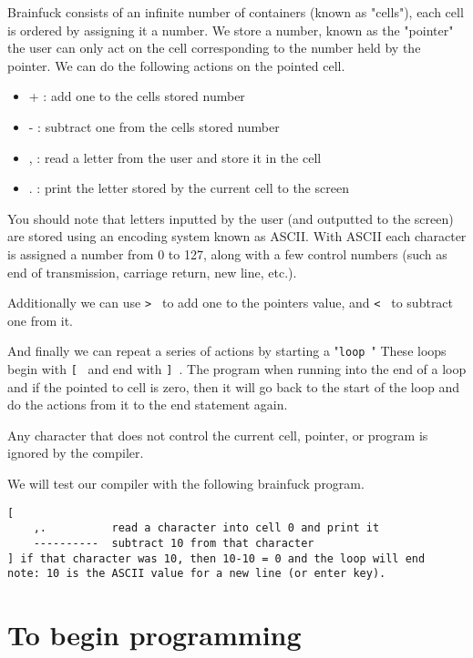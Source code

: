 \documentclass[12pt]{article}
\begin{document}
Brainfuck consists of an infinite number of containers
(known as "cells"), each cell is ordered by assigning
it a number. We store a number, known as the "pointer"
the user can only act on the cell corresponding to the
number held by the pointer. We can do the following
actions on the pointed cell.

\begin{itemize}
    \item{+ : add one to the cells stored number}
    \item{- : subtract one from the cells stored number}
    \item{, : read a letter from the user and store it in
        the cell}
    \item{. : print the letter stored by the current cell
        to the screen}
\end{itemize}

You should note that letters inputted by the user (and
outputted to the screen) are stored using an encoding
system known as ASCII. With ASCII each character
is assigned a number from 0 to 127, along with a few
control numbers (such as end of transmission, carriage
return, new line, etc.).

Additionally we can use {\tt > } to add one to the pointers
value, and {\tt < } to subtract one from it.

And finally we can repeat a series of actions by starting
a "{\tt loop }" These loops begin with {\tt [ } and end with
{\tt ] }. The program when running into the end of a loop
and if the pointed to cell is zero, then it will go back to the
start of the loop and do the actions from it to the end statement
again.

Any character that does not control the current cell, pointer,
or program is ignored by the compiler.

We will test our compiler with the following brainfuck program.

\begin{verbatim}
[
    ,.          read a character into cell 0 and print it
    ----------  subtract 10 from that character
] if that character was 10, then 10-10 = 0 and the loop will end
note: 10 is the ASCII value for a new line (or enter key).
\end{verbatim}

\section{To begin programming}
\end{document}
